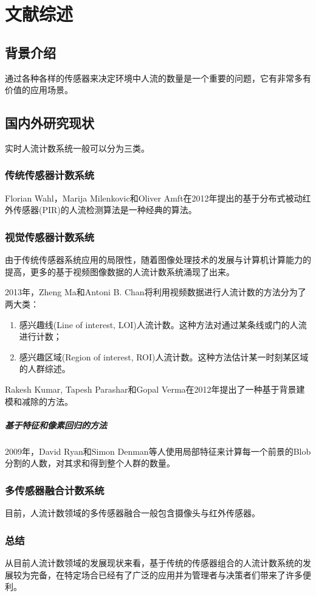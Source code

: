 \section{文献综述}
\subsection{背景介绍}
通过各种各样的传感器来决定环境中人流的数量是一个重要的问题，它有非常多有价值的应用场景。

\subsection{国内外研究现状}
实时人流计数系统一般可以分为三类。

\subsubsection{传统传感器计数系统}
Florian Wahl，Marija Milenkovic和Oliver Amft在2012年提出的基于分布式被动红外传感器(PIR)的人流检测算法\cite{Wahl2012ADP}是一种经典的算法。

\subsubsection{视觉传感器计数系统}
由于传统传感器系统应用的局限性，随着图像处理技术的发展与计算机计算能力的提高，更多的基于视频图像数据的人流计数系统涌现了出来。

2013年，Zheng Ma和Antoni B. Chan将利用视频数据进行人流计数的方法分为了两大类\cite{Ma2013CrossingTL}：
\begin{enumerate}
    \item 感兴趣线(Line of interest, LOI)人流计数。这种方法对通过某条线或门的人流进行计数；
    \item 感兴趣区域(Region of interest, ROI)人流计数。这种方法估计某一时刻某区域的人群综述。
\end{enumerate}

Rakesh Kumar, Tapesh Parashar和Gopal Verma在2012年提出了一种基于背景建模和减除的方法\cite{Kumar2012BackgroundMA}。


\subparagraph{基于特征和像素回归的方法}
2009年，David Ryan和Simon Denman等人使用局部特征来计算每一个前景的Blob分割的人数，对其求和得到整个人群的数量\cite{Ryan2009CrowdCU}。

\subsubsection{多传感器融合计数系统}
目前，人流计数领域的多传感器融合一般包含摄像头与红外传感器。

\subsubsection{总结}
从目前人流计数领域的发展现状来看，基于传统的传感器组合的人流计数系统的发展较为完备，在特定场合已经有了广泛的应用并为管理者与决策者们带来了许多便利。



